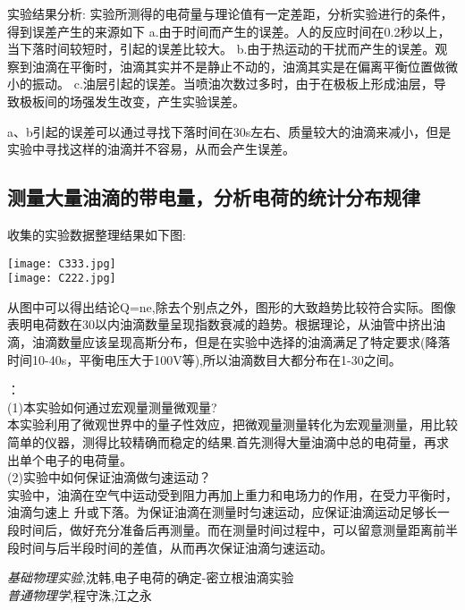 \documentclass[c5size,amstex,a4paper,twoside]{ctexart}
\begin{document}
    实验结果分析:
    实验所测得的电荷量与理论值有一定差距，分析实验进行的条件，得到误差产生的来源如下
    a.由于时间而产生的误差。人的反应时间在0.2秒以上，当下落时间较短时，引起的误差比较大。
    b.由于热运动的干扰而产生的误差。观察到油滴在平衡时，油滴其实并不是静止不动的，油滴其实是在偏离平衡位置做微小的振动。
    c.油层引起的误差。当喷油次数过多时，由于在极板上形成油层，导致极板间的场强发生改变，产生实验误差。

    a、b引起的误差可以通过寻找下落时间在30s左右、质量较大的油滴来减小，但是实验中寻找这样的油滴并不容易，从而会产生误差。

\subsection{测量大量油滴的带电量，分析电荷的统计分布规律}

收集的实验数据整理结果如下图:

\texttt{[image: C333.jpg]}\\

\texttt{[image: C222.jpg]}


从图中可以得出结论Q=ne,除去个别点之外，图形的大致趋势比较符合实际。图像表明电荷数在30以内油滴数量呈现指数衰减的趋势。根据理论，从油管中挤出油滴，油滴数量应该呈现高斯分布，但是在实验中选择的油滴满足了特定要求(降落时间10-40s，平衡电压大于100V等),所以油滴数目大都分布在1-30之间。

：\\
(1)本实验如何通过宏观量测量微观量?\\
本实验利用了微观世界中的量子性效应，把微观量测量转化为宏观量测量，用比较简单的仪器，测得比较精确而稳定的结果.首先测得大量油滴中总的电荷量，再求出单个电子的电荷量。\\
(2)实验中如何保证油滴做匀速运动？\\
实验中，油滴在空气中运动受到阻力再加上重力和电场力的作用，在受力平衡时，油滴匀速上 升或下落。为保证油滴在测量时匀速运动，应保证油滴运动足够长一段时间后，做好充分准备后再测量。而在测量时间过程中，可以留意测量距离前半段时间与后半段时间的差值，从而再次保证油滴匀速运动。


\begin{thebibliography}{99}
\emph{基础物理实验},沈韩,电子电荷的确定-密立根油滴实验\\
\emph{普通物理学},程守洙,江之永
\end{thebibliography}
\end{document}
